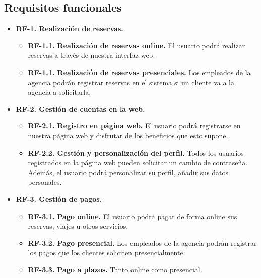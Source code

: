 \documentclass{article}
\begin{document}
	\subsection{Requisitos funcionales}
	\begin{itemize}
		\item {\bf RF-1. Realización de reservas.}
		\begin{itemize}
			\item \textbf{RF-1.1. Realización de reservas online.} El usuario podrá realizar reservas a través de nuestra interfaz web. 
			\item {\bf RF-1.1. Realización de reservas presenciales.} Los empleados de la agencia podrán registrar reservas en el sistema si un cliente va a la agencia a solicitarla.
		\end{itemize}
		\item \textbf{RF-2. Gestión de cuentas en la web.}
		\begin{itemize}
			\item {\bf RF-2.1. Registro en página web.} El usuario podrá registrarse en nuestra página web y disfrutar de los beneficios que esto supone.
			\item {\bf RF-2.2. Gestión y personalización del perfil.} Todos los usuarios registrados en la página web pueden solicitar un cambio de contraseña. Además, el usuario podrá personalizar su perfil, añadir sus datos personales.
		\end{itemize}
		\item \textbf{RF-3. Gestión de pagos.}
		\begin{itemize}
			\item {\bf RF-3.1. Pago online.} El usuario podrá pagar de forma online sus reservas, viajes u otros servicios.
			\item {\bf RF-3.2. Pago presencial.} Los empleados de la agencia podrán registrar los pagos que los clientes soliciten presencialmente.
			\item {\bf RF-3.3. Pago a plazos.} Tanto online como presencial.
		\end{itemize}
		

\end{itemize}
\end{document}
